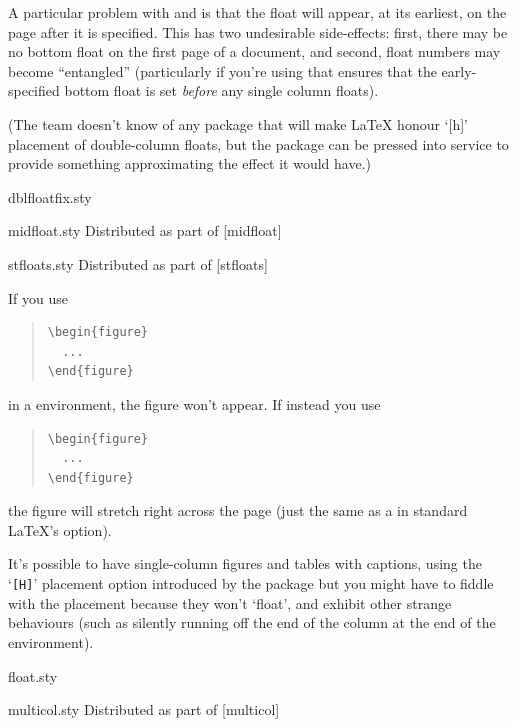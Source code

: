 A particular problem with  and 
is that the float will appear, at its earliest, on the page after it
is specified.  This has two undesirable side-effects: first, there may
be no bottom float on the first page of a document, and second, float
numbers may become ``entangled'' (particularly if you're using
 that ensures that the early-specified bottom
float is set \emph{before} any single column floats).

(The  team doesn't know of any package that will make
\LaTeX{} honour `[h]' placement of double-column floats, but the
 package can be pressed into service to provide
something approximating the effect it would have.)
\begin{ctanrefs}
\item[dblfloatfix.sty]
\item[midfloat.sty]Distributed as part of [midfloat]
\item[stfloats.sty]Distributed as part of [stfloats]
\end{ctanrefs}


If you use
\begin{quote}
\begin{verbatim}
\begin{figure}
  ...
\end{figure}
\end{verbatim}
\end{quote}
in a  environment, the figure won't appear.  If
instead you use
\begin{quote}
\begin{verbatim}
\begin{figure}
  ...
\end{figure}
\end{verbatim}
\end{quote}
the figure will stretch right across the page (just the same as a
 in standard \LaTeX{}'s  option).

It's possible to have single-column figures and tables with captions,
using the `\texttt{[H]}' placement option introduced by the 
package but you might have to fiddle with the placement because they
won't `float', and exhibit other strange behaviours (such as silently
running off the end of the column at the end of the
 environment).
\begin{ctanrefs}
\item[float.sty]
\item[multicol.sty]Distributed as part of [multicol]
\end{ctanrefs}

